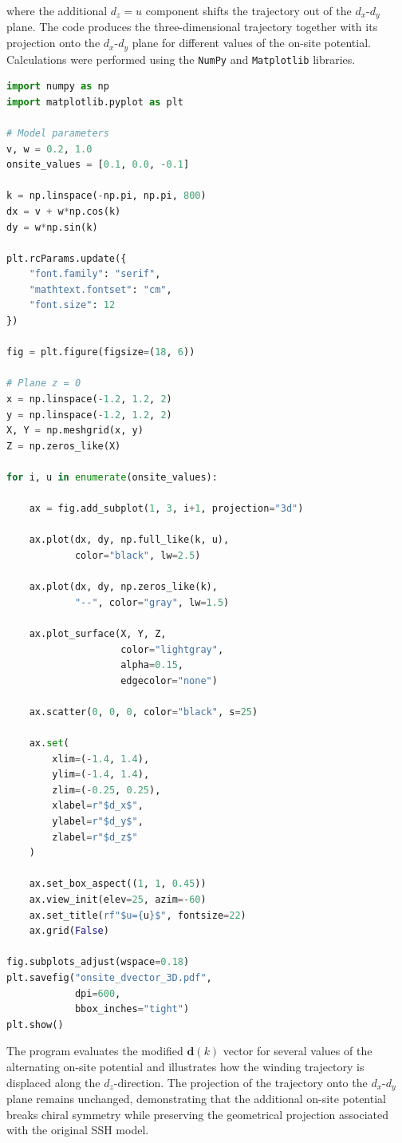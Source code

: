 \documentclass[11pt, a4paper]{article}
\begin{document}
where the additional \(d_z=u\) component shifts the trajectory out of the
\(d_x\)-\(d_y\) plane. The code produces the three-dimensional trajectory together with its projection onto the \(d_x\)-\(d_y\) plane for different values of the on-site potential. Calculations were performed using the \texttt{NumPy} and \texttt{Matplotlib} libraries.

\begin{lstlisting}[language=Python,
caption={Python implementation used to generate the three-dimensional winding trajectories of the SSH model in the presence of an alternating on-site potential.},
label={lst:onsite_winding}]
import numpy as np
import matplotlib.pyplot as plt

# Model parameters
v, w = 0.2, 1.0
onsite_values = [0.1, 0.0, -0.1]

k = np.linspace(-np.pi, np.pi, 800)
dx = v + w*np.cos(k)
dy = w*np.sin(k)

plt.rcParams.update({
    "font.family": "serif",
    "mathtext.fontset": "cm",
    "font.size": 12
})

fig = plt.figure(figsize=(18, 6))

# Plane z = 0
x = np.linspace(-1.2, 1.2, 2)
y = np.linspace(-1.2, 1.2, 2)
X, Y = np.meshgrid(x, y)
Z = np.zeros_like(X)

for i, u in enumerate(onsite_values):

    ax = fig.add_subplot(1, 3, i+1, projection="3d")

    ax.plot(dx, dy, np.full_like(k, u),
            color="black", lw=2.5)

    ax.plot(dx, dy, np.zeros_like(k),
            "--", color="gray", lw=1.5)

    ax.plot_surface(X, Y, Z,
                    color="lightgray",
                    alpha=0.15,
                    edgecolor="none")

    ax.scatter(0, 0, 0, color="black", s=25)

    ax.set(
        xlim=(-1.4, 1.4),
        ylim=(-1.4, 1.4),
        zlim=(-0.25, 0.25),
        xlabel=r"$d_x$",
        ylabel=r"$d_y$",
        zlabel=r"$d_z$"
    )

    ax.set_box_aspect((1, 1, 0.45))
    ax.view_init(elev=25, azim=-60)
    ax.set_title(rf"$u={u}$", fontsize=22)
    ax.grid(False)

fig.subplots_adjust(wspace=0.18)
plt.savefig("onsite_dvector_3D.pdf",
            dpi=600,
            bbox_inches="tight")
plt.show()

\end{lstlisting}

The program evaluates the modified \(\mathbf d(k)\) vector for several values of the alternating on-site potential and illustrates how the winding trajectory is displaced along the \(d_z\)-direction. The projection of the trajectory onto the \(d_x\)-\(d_y\) plane remains unchanged, demonstrating that the additional on-site potential breaks chiral symmetry while preserving the geometrical projection associated with the original SSH model.
\end{document}
